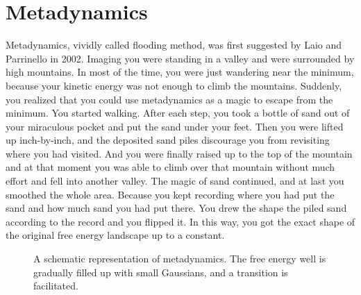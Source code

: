 \section{Metadynamics\label{Sec:ES:metadynamics}}
Metadynamics, vividly called flooding method, was first suggested by Laio and Parrinello in 2002.\cite{LaioPNAS2002} 
Imaging you were standing in a valley and were surrounded by high mountains. In most of the time, you were just wandering near the minimum, because your kinetic energy was not enough to climb the mountains. Suddenly, you realized that you could use metadynamics as a magic to escape from the minimum. You started walking. After each step, you took a bottle of sand out of your miraculous pocket and put the sand under your feet. Then you were lifted up inch-by-inch, and the deposited sand piles discourage you from revisiting where you had visited. And you were finally raised up to the top of the mountain and at that moment you was able to climb over that mountain without much effort and fell into another valley. The magic of sand continued, and at last you smoothed the whole area. Because you kept recording where you had put the sand and how much sand you had put there. You drew the shape the piled sand according to the record and you flipped it. In this way, you got the exact shape of the original free energy landscape up to a constant. 
\begin{figure}[htbp]
	\centering
	\caption{A schematic representation of metadynamics. The free energy well is gradually filled up with small Gaussians, and a transition is facilitated.}\label{Fig:ES:metadynamics}
\end{figure}

